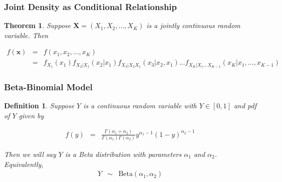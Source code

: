 \documentclass{beamer}
\newtheorem{thm}{Theorem}
\newtheorem{defn}{Definition}
\numberwithin{equation}{section}
\begin{document}
\begin{frame}
\frametitle{Joint Density as Conditional Relationship}

\small
\begin{thm}
Suppose $\boldsymbol{X} = (X_{1}, X_{2}, \hdots, X_{K})$ is a jointly continuous random variable.  Then 

\begin{eqnarray}
f(\boldsymbol{x} ) & = & f(x_{1}, x_{2}, \hdots, x_{K}) \nonumber \\
 & = & f_{X_{1}} (x_{1} ) f_{X_{2} | X_{1} } (x_{2} | x_{1} ) f_{X_{3} | X_{2} X_{1} } (x_{3} | x_2, x_{1}) \hdots f_{X_{K} | X_{1} \hdots X_{K-1} } (x_{K} | x_{1}, \hdots, x_{K-1} ) \nonumber 
\end{eqnarray}



\end{thm}

\pause 
\begin{itemize}
 \pause 
{} 
\end{itemize}


\end{frame}

\begin{frame}
\frametitle{Beta-Binomial Model}

\begin{defn}
Suppose $Y$ is a continuous random variable with $Y \in [0,1]$ and pdf of $Y$ given by 

\begin{eqnarray}
f(y) & = & \frac{\Gamma(\alpha_1 + \alpha_2)}{\Gamma(\alpha_{1} ) \Gamma(\alpha_{2})} y^{\alpha_{1} - 1} (1- y)^{\alpha_{2} - 1 } \nonumber 
\end{eqnarray}

Then we will say $Y$ is a \alert{Beta} distribution with parameters $\alpha_{1}$ and $\alpha_{2}$.  Equivalently,
\begin{eqnarray}
Y & \sim & \text{Beta}(\alpha_{1}, \alpha_{2} ) \nonumber 
\end{eqnarray}



\end{defn}

\pause 
\begin{itemize}
 \pause 
{} \pause 
{} 
\end{itemize}


\end{frame}
\end{document}
